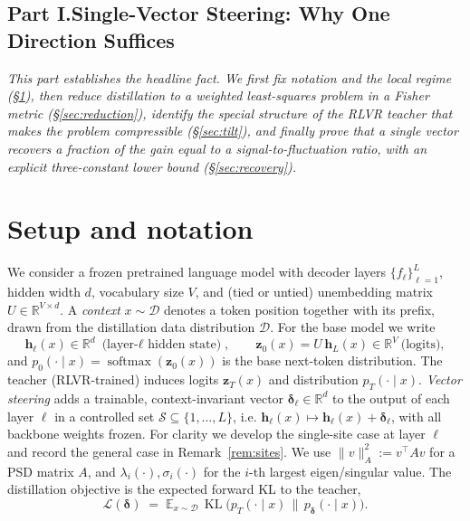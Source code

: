 \documentclass[11pt]{article}
\DeclareMathOperator{\KL}{KL}
\DeclareMathOperator{\softmax}{softmax}
\newcommand{\R}{\mathbb{R}}
\newcommand{\E}{\mathbb{E}}
\newcommand{\bh}{\mathbf{h}}
\newcommand{\bz}{\mathbf{z}}
\newcommand{\bdelta}{\bm{\delta}}
\begin{document}
\subsection*{Part I.\quad Single-Vector Steering: Why One Direction Suffices}
\noindent\emph{This part establishes the headline fact. We first fix notation and the local regime
(\S\ref{sec:setup}), then reduce distillation to a weighted least-squares problem in a Fisher metric
(\S\ref{sec:reduction}), identify the special structure of the RLVR teacher that makes the problem
compressible (\S\ref{sec:tilt}), and finally prove that a single vector recovers a fraction of the
gain equal to a signal-to-fluctuation ratio, with an explicit three-constant lower bound
(\S\ref{sec:recovery}).}

\section{Setup and notation}\label{sec:setup}
We consider a frozen pretrained language model with decoder layers $\{f_\ell\}_{\ell=1}^{L}$,
hidden width $d$, vocabulary size $V$, and (tied or untied) unembedding matrix $U\in\R^{V\times d}$.
A \emph{context} $x\sim\mathcal D$ denotes a token position together with its prefix, drawn from the
distillation data distribution $\mathcal D$. For the base model we write
\begin{equation*}
\bh_\ell(x)\in\R^{d}\ \text{(layer-$\ell$ hidden state)},\qquad
\bz_0(x)=U\,\bh_L(x)\in\R^{V}\ \text{(logits)},
\end{equation*}
and $p_0(\cdot\mid x)=\softmax(\bz_0(x))$ is the base next-token distribution. The teacher
(RLVR-trained) induces logits $\bz_T(x)$ and distribution $p_T(\cdot\mid x)$. \emph{Vector steering}
adds a trainable, context-invariant vector $\bdelta_\ell\in\R^{d}$ to the output of each layer $\ell$
in a controlled set $\mathcal S\subseteq\{1,\dots,L\}$, i.e. $\bh_\ell(x)\mapsto\bh_\ell(x)+\bdelta_\ell$,
with all backbone weights frozen. For clarity we develop the single-site case at layer $\ell$ and
record the general case in Remark~\ref{rem:sites}. We use $\|v\|_A^2:=v^\top A v$ for a PSD matrix
$A$, and $\lambda_i(\cdot),\sigma_i(\cdot)$ for the $i$-th largest eigen/singular value. The
distillation objective is the expected forward KL to the teacher,
\begin{equation}\label{eq:obj}
\mathcal L(\bdelta)\;=\;\E_{x\sim\mathcal D}\,
\KL\!\big(p_T(\cdot\mid x)\,\big\|\,p_{\bdelta}(\cdot\mid x)\big).
\end{equation}
\end{document}
